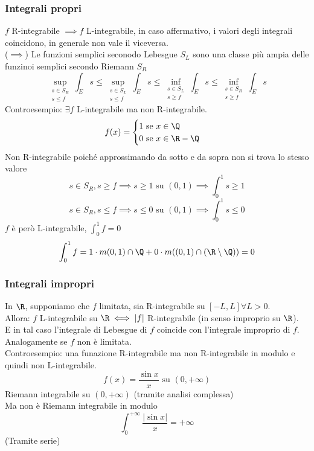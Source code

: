 \subsubsection{Integrali propri}
$f$ R-integrabile $\implies f$ L-integrabile, in caso affermativo, i valori degli integrali coincidono, in generale non vale il viceversa.
\\($\implies$) Le funzioni semplici seconodo Lebesgue $S_L$ sono una classe più ampia delle funzinoi semplici secondo Riemann $S_R$
\[\sup_{\substack{s\in S_R\\s\le f}}\int_{E}^{}s\le \sup_{\substack{s\in S_L\\s\le f}}\int_{E}^{} s \le \inf_{\substack{s \in S_L\\s\ge f}}\int_{E}^{}  s\le   \inf_{\substack{s\in S_R\\s\ge f}}\int_{E}^{}s\]
Controesempio: $\exists f$ L-integrabile ma non R-integrabile.
\[f(x)=\begin{cases}
	1\text{ se }x\in\Q\\
	0\text{ se }x\in \R-\Q
\end{cases}\]
Non R-integrabile poiché approssimando da sotto e da sopra non si trova lo stesso valore
\[s\in S_R,s\ge f\implies s\ge 1\text{ su }(0,1)\implies \int_{0}^{1} s\ge 1\]
\[s\in S_R, s\le f\implies s\le 0\text{ su }(0,1)\implies \int_{0}^{1} s\le 0\]
$f$ è però L-integrabile, $\int_{0}^{1} f=0$
\[\int_{0}^{1} f=1\cdot m(0,1)\cap\Q+0\cdot m((0,1)\cap(\R\setminus\Q))=0\]
\subsubsection{Integrali impropri}
In $\R$, supponiamo che $f$ limitata, sia R-integrabile su $[-L,L]\forall L>0$.
\\Allora: $f$ L-integrabile su $\R \iff|f|$ R-integrabile (in senso improprio su $\R$).
\\E in tal caso l'integrale di Lebesgue di $f$ coincide con l'integrale improprio di $f$.
\\Analogamente se $f$ non è limitata.
\\Controesempio: una funazione R-integrabile ma non R-integrabile in modulo e quindi non L-integrabile.
\[f(x)= \frac{\sin x}{x}\text{  su }(0,+\infty)\]
Riemann integrabile su $(0,+\infty)$ (tramite analisi complessa)
\\Ma non è Riemann integrabile in modulo
\[\int_{0}^{+\infty} \frac{|\sin x|}{x}=+\infty\]
(Tramite serie)

